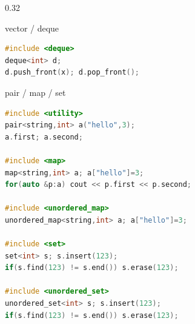 \documentclass[final]{beamer}
\begin{document}
\begin{frame}[t,fragile]
\begin{columns}[t,totalwidth=\paperwidth, colsep=0.015\paperwidth]
\begin{column}{0.32\paperwidth}
\begin{block}{vector / deque}
\begin{lstlisting}[language=C++]
#include <deque>
deque<int> d;
d.push_front(x); d.pop_front();
\end{lstlisting}
\end{block}

\begin{block}{pair / map / set}
\begin{lstlisting}[language=C++]
#include <utility>
pair<string,int> a("hello",3);
a.first; a.second;

#include <map>
map<string,int> a; a["hello"]=3;
for(auto &p:a) cout << p.first << p.second;

#include <unordered_map>
unordered_map<string,int> a; a["hello"]=3;

#include <set>
set<int> s; s.insert(123);
if(s.find(123) != s.end()) s.erase(123);

#include <unordered_set>
unordered_set<int> s; s.insert(123);
if(s.find(123) != s.end()) s.erase(123);
\end{lstlisting}
\end{block}

\end{column}

\end{columns}

\end{frame}
\end{document}
